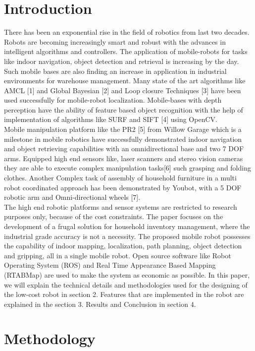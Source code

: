 \documentclass[conference]{IEEEtran}
\begin{document}
\section{Introduction}
There has been an exponential rise in the field of robotics from last two decades. Robots are becoming increasingly smart and robust with the advances in intelligent algorithms and controllers. The application of mobile-robots for tasks like indoor navigation, object detection and retrieval is increasing by the day. Such mobile bases are also finding an increase in application in industrial environments for warehouse management. Many state of the art algorithms like AMCL [1] and Global Bayesian [2] and Loop closure Techniques [3] have been used successfully for mobile-robot localization. Mobile-bases with depth perception have the ability of feature based object recognition with the help of implementation of algorithms like SURF and SIFT [4] using OpenCV.\\
Mobile manipulation platform like the PR2 [5] from Willow Garage which is a milestone in mobile  
robotics have successfully demonstrated indoor navigation and object retrieving capabilities with an omnidirectional base and two 7 DOF arms. Equipped high end sensors like, laser scanners and stereo vision cameras they are able to execute complex manipulation tasks[6] such grasping and folding clothes. Another Complex task of assembly of household furniture in a multi robot coordinated approach has been demonstrated by Youbot, with a 5 DOF robotic arm and Omni-directional wheels [7]. \\
The high end robotic platforms and sensor systems are restricted to research purposes only, because of the cost constraints. The paper focuses on the development of a frugal solution for household inventory management, where the industrial grade accuracy is not a necessity. The proposed mobile robot possesses the capability of indoor mapping, localization, path planning, object detection and gripping, all in a single mobile robot. Open source software like Robot Operating System (ROS) and Real Time Appearance Based Mapping (RTABMap) are used to make the system as economic as possible. 
In this paper, we will explain the technical details and methodologies used for the designing of the low-cost robot in section 2. Features that are implemented in the robot are explained in the section 3. Results and Conclusion in section 4.

\section{Methodology}
\end{document}
